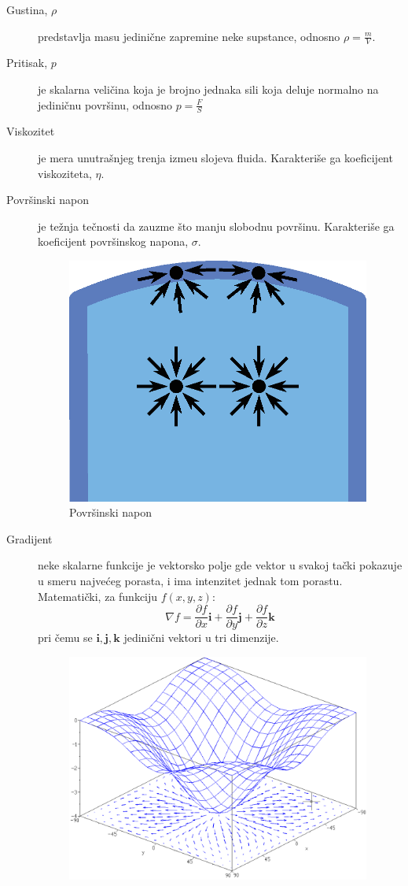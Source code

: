 \documentclass[12pt]{article}
\renewcommand{\vec}[1]{\mathbf{#1}}
\begin{document}
        \begin{description}
          \item[Gustina, $\rho$] predstavlja masu jedini\v cne zapremine neke supstance, odnosno $\rho = \frac{m}{V}$.
          \item[Pritisak, $p$] je skalarna veli\v cina koja je brojno jednaka sili koja deluje normalno na jedini\v cnu povr\v sinu, odnosno $p = \frac{F}{S}$
          \item[Viskozitet] je mera unutra\v snjeg trenja izme\dj u slojeva fluida. Karakteri\v se ga koeficijent viskoziteta, $\eta$.
          \item[Povr\v sinski napon] je te\v znja te\v cnosti da zauzme \v sto manju slobodnu povr\v sinu. Karakteri\v se ga koeficijent povr\v sinskog napona, $\sigma$.
              \begin{figure}[H]
              \centering%
              \includegraphics[width=10cm]{./figures/povrsinski_napon.eps}
              \caption{Povr\v sinski napon}
              \end{figure}
          \item[Gradijent] neke skalarne funkcije je vektorsko polje gde vektor u svakoj ta\v cki pokazuje u smeru najve\'ceg porasta, i ima intenzitet jednak tom porastu. Matemati\v cki, za funkciju $f(x, y, z)$:
                $$\nabla f=\frac{\partial f}{\partial x}\vec{i} + \frac{\partial f}{\partial y}\vec{j} + \frac{\partial f}{\partial z}\vec{k}$$ pri \v cemu se $\vec{i}, \vec{j}, \vec{k}$ jedini\v cni vektori u tri dimenzije.
                \begin{figure}[H]
                \centering%
                \includegraphics[width=10cm]{./figures/Gradient.png}

\end{figure}
\end{description}
\end{document}
